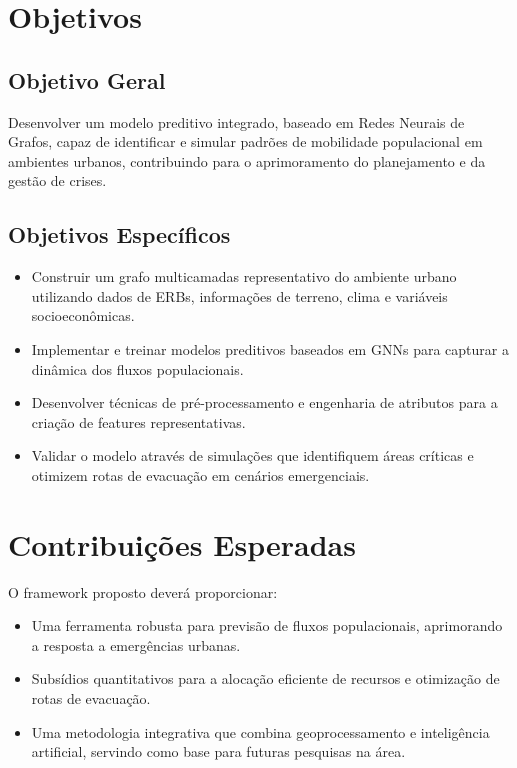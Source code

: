 \section{Objetivos}
\subsection{Objetivo Geral}
Desenvolver um modelo preditivo integrado, baseado em Redes Neurais de Grafos, capaz de identificar e simular padrões de mobilidade populacional em ambientes urbanos, contribuindo para o aprimoramento do planejamento e da gestão de crises.

\subsection{Objetivos Específicos}
\begin{itemize}[noitemsep]
    \item Construir um grafo multicamadas representativo do ambiente urbano utilizando dados de \gls{ERB}s, informações de terreno, clima e variáveis socioeconômicas.
    \item Implementar e treinar modelos preditivos baseados em \gls{GNN}s para capturar a dinâmica dos fluxos populacionais.
    \item Desenvolver técnicas de pré-processamento e engenharia de atributos para a criação de features representativas.
    \item Validar o modelo através de simulações que identifiquem áreas críticas e otimizem rotas de evacuação em cenários emergenciais.
\end{itemize}

\section{Contribuições Esperadas}
O framework proposto deverá proporcionar:
\begin{itemize}[noitemsep]
    \item Uma ferramenta robusta para previsão de fluxos populacionais, aprimorando a resposta a emergências urbanas.
    \item Subsídios quantitativos para a alocação eficiente de recursos e otimização de rotas de evacuação.
    \item Uma metodologia integrativa que combina geoprocessamento e inteligência artificial, servindo como base para futuras pesquisas na área.
\end{itemize}

